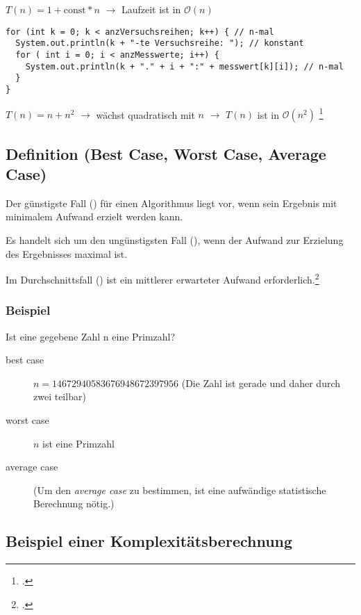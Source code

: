 \documentclass{bschlangaul-theorie}
\begin{document}
\noindent
$T(n) = 1 + \text{const} * n$
$\rightarrow$ Laufzeit ist in $\mathcal{O}(n)$

\begin{verbatim}
for (int k = 0; k < anzVersuchsreihen; k++) { // n-mal
  System.out.println(k + "-te Versuchsreihe: "); // konstant
  for ( int i = 0; i < anzMesswerte; i++) {
    System.out.println(k + "." + i + ":" + messwert[k][i]); // n-mal
  }
}
\end{verbatim}

\noindent
$T(n)= n + n^2$
$\rightarrow$ wächst quadratisch mit $n$
$\rightarrow$ $T(n)$ ist in $\mathcal{O}(n^2)$
\footcite[Seite 25 (PDF 17)]{aud:fs:2}

%

\subsection{Definition (Best Case, Worst Case, Average Case)}

Der günstigste Fall () für einen Algorithmus liegt vor,
wenn sein Ergebnis mit minimalem Aufwand erzielt werden kann.

Es handelt sich um den ungünstigsten Fall (), wenn der
Aufwand zur Erzielung des Ergebnisses maximal ist.

Im Durchschnittsfall () ist ein mittlerer erwarteter
Aufwand erforderlich.\footcite[Seite 26 (PDF 18)]{aud:fs:2}

\subsubsection{Beispiel}

Ist eine gegebene Zahl n eine Primzahl?

\begin{description}
\item[best case] $n = 14672940583676948672397956$
(Die Zahl ist gerade und daher durch zwei teilbar)

\item[worst case] $n$ ist eine Primzahl

\item[average case] (Um den \emph{average case} zu bestimmen, ist eine
aufwändige statistische Berechnung nötig.)
\end{description}

%

\subsection{Beispiel einer Komplexitätsberechnung}
\end{document}
